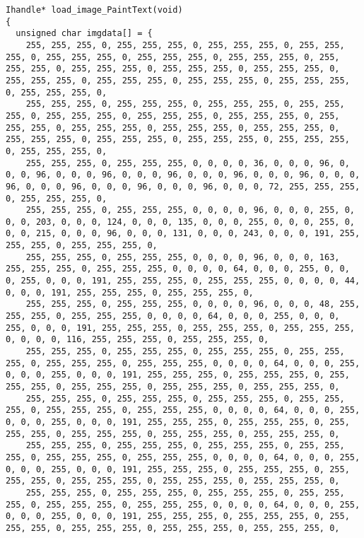 \documentclass{ctexart}
\begin{document}
\begin{lstlisting}
Ihandle* load_image_PaintText(void)
{
  unsigned char imgdata[] = {
    255, 255, 255, 0, 255, 255, 255, 0, 255, 255, 255, 0, 255, 255, 255, 0, 255, 255, 255, 0, 255, 255, 255, 0, 255, 255, 255, 0, 255, 255, 255, 0, 255, 255, 255, 0, 255, 255, 255, 0, 255, 255, 255, 0, 255, 255, 255, 0, 255, 255, 255, 0, 255, 255, 255, 0, 255, 255, 255, 0, 255, 255, 255, 0,
    255, 255, 255, 0, 255, 255, 255, 0, 255, 255, 255, 0, 255, 255, 255, 0, 255, 255, 255, 0, 255, 255, 255, 0, 255, 255, 255, 0, 255, 255, 255, 0, 255, 255, 255, 0, 255, 255, 255, 0, 255, 255, 255, 0, 255, 255, 255, 0, 255, 255, 255, 0, 255, 255, 255, 0, 255, 255, 255, 0, 255, 255, 255, 0,
    255, 255, 255, 0, 255, 255, 255, 0, 0, 0, 0, 36, 0, 0, 0, 96, 0, 0, 0, 96, 0, 0, 0, 96, 0, 0, 0, 96, 0, 0, 0, 96, 0, 0, 0, 96, 0, 0, 0, 96, 0, 0, 0, 96, 0, 0, 0, 96, 0, 0, 0, 96, 0, 0, 0, 72, 255, 255, 255, 0, 255, 255, 255, 0,
    255, 255, 255, 0, 255, 255, 255, 0, 0, 0, 0, 96, 0, 0, 0, 255, 0, 0, 0, 203, 0, 0, 0, 124, 0, 0, 0, 135, 0, 0, 0, 255, 0, 0, 0, 255, 0, 0, 0, 215, 0, 0, 0, 96, 0, 0, 0, 131, 0, 0, 0, 243, 0, 0, 0, 191, 255, 255, 255, 0, 255, 255, 255, 0,
    255, 255, 255, 0, 255, 255, 255, 0, 0, 0, 0, 96, 0, 0, 0, 163, 255, 255, 255, 0, 255, 255, 255, 0, 0, 0, 0, 64, 0, 0, 0, 255, 0, 0, 0, 255, 0, 0, 0, 191, 255, 255, 255, 0, 255, 255, 255, 0, 0, 0, 0, 44, 0, 0, 0, 191, 255, 255, 255, 0, 255, 255, 255, 0,
    255, 255, 255, 0, 255, 255, 255, 0, 0, 0, 0, 96, 0, 0, 0, 48, 255, 255, 255, 0, 255, 255, 255, 0, 0, 0, 0, 64, 0, 0, 0, 255, 0, 0, 0, 255, 0, 0, 0, 191, 255, 255, 255, 0, 255, 255, 255, 0, 255, 255, 255, 0, 0, 0, 0, 116, 255, 255, 255, 0, 255, 255, 255, 0,
    255, 255, 255, 0, 255, 255, 255, 0, 255, 255, 255, 0, 255, 255, 255, 0, 255, 255, 255, 0, 255, 255, 255, 0, 0, 0, 0, 64, 0, 0, 0, 255, 0, 0, 0, 255, 0, 0, 0, 191, 255, 255, 255, 0, 255, 255, 255, 0, 255, 255, 255, 0, 255, 255, 255, 0, 255, 255, 255, 0, 255, 255, 255, 0,
    255, 255, 255, 0, 255, 255, 255, 0, 255, 255, 255, 0, 255, 255, 255, 0, 255, 255, 255, 0, 255, 255, 255, 0, 0, 0, 0, 64, 0, 0, 0, 255, 0, 0, 0, 255, 0, 0, 0, 191, 255, 255, 255, 0, 255, 255, 255, 0, 255, 255, 255, 0, 255, 255, 255, 0, 255, 255, 255, 0, 255, 255, 255, 0,
    255, 255, 255, 0, 255, 255, 255, 0, 255, 255, 255, 0, 255, 255, 255, 0, 255, 255, 255, 0, 255, 255, 255, 0, 0, 0, 0, 64, 0, 0, 0, 255, 0, 0, 0, 255, 0, 0, 0, 191, 255, 255, 255, 0, 255, 255, 255, 0, 255, 255, 255, 0, 255, 255, 255, 0, 255, 255, 255, 0, 255, 255, 255, 0,
    255, 255, 255, 0, 255, 255, 255, 0, 255, 255, 255, 0, 255, 255, 255, 0, 255, 255, 255, 0, 255, 255, 255, 0, 0, 0, 0, 64, 0, 0, 0, 255, 0, 0, 0, 255, 0, 0, 0, 191, 255, 255, 255, 0, 255, 255, 255, 0, 255, 255, 255, 0, 255, 255, 255, 0, 255, 255, 255, 0, 255, 255, 255, 0,

\end{lstlisting}
\end{document}
